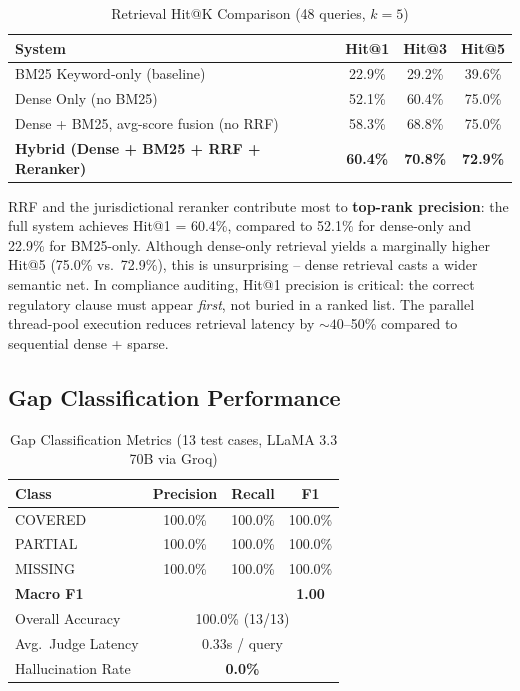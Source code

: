 \documentclass[conference, a4paper]{IEEEtran}
\begin{document}
\begin{table}[htbp]
\centering
\caption{Retrieval Hit@K Comparison (48 queries, $k{=}5$)}
\label{tab:retrieval}
\begin{tabularx}{\columnwidth}{>{\raggedright\arraybackslash}X c c c}
\toprule
\textbf{System} & \textbf{Hit@1} & \textbf{Hit@3} & \textbf{Hit@5} \\
\midrule
BM25 Keyword-only (baseline) & 22.9\% & 29.2\% & 39.6\% \\
Dense Only (no BM25) & 52.1\% & 60.4\% & 75.0\% \\
Dense + BM25, avg-score fusion (no RRF) & 58.3\% & 68.8\% & 75.0\% \\
\textbf{Hybrid (Dense + BM25 + RRF + Reranker)} & \textbf{60.4\%} & \textbf{70.8\%} & \textbf{72.9\%} \\
\bottomrule
\end{tabularx}
\end{table}

RRF and the jurisdictional reranker contribute most to \textbf{top-rank precision}: the full
system achieves Hit@1 = 60.4\%, compared to 52.1\% for dense-only and 22.9\% for BM25-only.
Although dense-only retrieval yields a marginally higher Hit@5 (75.0\% vs.\ 72.9\%), this is
unsurprising -- dense retrieval casts a wider semantic net. In compliance auditing, Hit@1
precision is critical: the correct regulatory clause must appear \emph{first}, not buried in a
ranked list. The parallel thread-pool execution reduces retrieval latency by ${\sim}40$--50\%
compared to sequential dense + sparse.

\subsection{Gap Classification Performance}

\begin{table}[htbp]
\centering
\caption{Gap Classification Metrics (13 test cases, LLaMA 3.3 70B via Groq)}
\label{tab:classification}
\begin{tabularx}{\columnwidth}{>{\raggedright\arraybackslash}X c c c}
\toprule
\textbf{Class} & \textbf{Precision} & \textbf{Recall} & \textbf{F1} \\
\midrule
COVERED & 100.0\% & 100.0\% & 100.0\% \\
PARTIAL & 100.0\% & 100.0\% & 100.0\% \\
MISSING & 100.0\% & 100.0\% & 100.0\% \\
\midrule
\textbf{Macro F1} & & & \textbf{1.00} \\
Overall Accuracy & \multicolumn{3}{c}{100.0\% (13/13)} \\
Avg.\ Judge Latency & \multicolumn{3}{c}{0.33s / query} \\
Hallucination Rate & \multicolumn{3}{c}{\textbf{0.0\%}} \\
\bottomrule
\end{tabularx}
\end{table}
\end{document}
